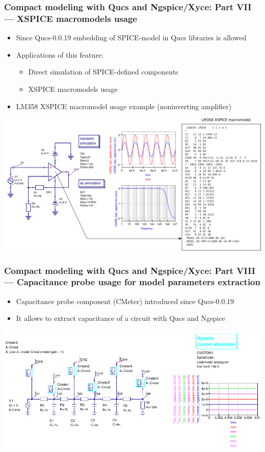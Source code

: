 \documentclass[9pt]{beamer}
\begin{document}
 \begin{frame}
  \frametitle{Compact modeling with Qucs and Ngspice/Xyce: Part VII --- 
XSPICE macromodels usage}

 \begin{itemize}
  \item Since Qucs-0.0.19 embedding of SPICE-model in Qucs libraries is 
allowed 
  \item Applications of this feature:
  \begin{itemize}
   \item Direct simulation of SPICE-defined components
   \item XSPICE macromodels usage
  \end{itemize}
  \item{LM358 XSPICE macromodel usage example (noninverting amplifier)}
 \end{itemize}
 
 \hspace{-8mm}
 \includegraphics[width=\textwidth]{img/LM358.pdf}
 
 \end{frame}


\begin{frame}
 \frametitle{Compact modeling with Qucs and Ngspice/Xyce: Part VIII --- 
Capacitance probe usage for model parameters extraction}

\begin{itemize}
 \item Capacitance probe component (CMeter) introduced since 
Qucs-0.0.19
 \item It allows to extract capacitance of a circuit with Qucs and Ngspice
\end{itemize}

 \includegraphics[width=\textwidth]{img/CMeter.png}

\end{frame}
\end{document}
